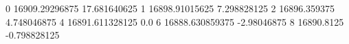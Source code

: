 0 16909.29296875 17.681640625
1 16898.91015625 7.298828125
2 16896.359375 4.748046875
4 16891.611328125 0.0
6 16888.630859375 -2.98046875
8 16890.8125 -0.798828125
